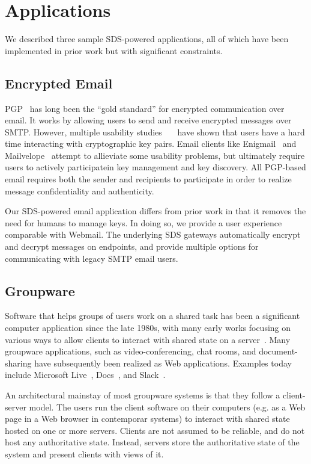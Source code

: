 \section{Applications}

We described three sample SDS-powered applications, all of which have been
implemented in prior work but with significant constraints.

\subsection{Encrypted Email}

PGP~\cite{pgp} has long been the ``gold standard'' for encrypted communication
over email.  It works by allowing users to send and receive encrypted messages
over SMTP.  However, multiple usability
studies~\cite{why-johnny-cant-encrypt}~\cite{why-johnny-still-cant-encrypt}~\cite{why-jonny-still-still-cant-encrypt}
have shown that users have a hard time interacting with cryptographic key pairs.
Email clients like Enigmail~\cite{enigmail} and Mailvelope~\cite{mailvelope}
attempt to allieviate some usability problems, but ultimately require users to
actively participatein key management and key discovery.  All PGP-based email
requires both the sender and recipients to participate in order to realize
message confidentiality and authenticity.

Our SDS-powered email application differs from prior work in that it removes the
need for humans to manage keys.  In doing so, we provide a user experience
comparable with Webmail.  The underlying SDS gateways automatically encrypt and
decrypt messages on endpoints, and provide multiple options for communicating
with legacy SMTP email users.

\subsection{Groupware}

Software that helps groups of users work on a shared task has been a significant
computer application since the late 1980s, with many early works focusing
on various ways to allow clients to interact with shared state on a server~\cite{readings-in-groupware}.
Many groupware applications, such as video-conferencing, chat rooms,
and document-sharing have subsequently been realized as Web applications.
Examples today include Microsoft Live~\cite{microsoft-live},
Docs~\cite{google-docs}, and Slack~\cite{slack}.

An architectural mainstay of most groupware systems is that they follow a client-server model.
The users run the client software on their computers (e.g.
as a Web page in a Web browser in contemporar systems) to interact with shared state hosted on one or
more servers.  Clients are not assumed to be reliable, and do not host any
authoritative state.  Instead, servers store the authoritative state of the system and
present clients with views of it.

